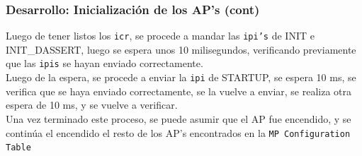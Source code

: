 \documentclass{beamer}
\begin{document}
\begin{frame}
  \frametitle{Desarrollo: \small Inicialización de los AP's (cont)}
  Luego de tener listos los \texttt{icr}, se procede a mandar las \texttt{ipi's} de INIT e INIT\_DASSERT, luego se espera unos 10 milisegundos, verificando previamente que las \texttt{ipis} se hayan enviado correctamente. \\
  \vspace{10pt}
  Luego de la espera, se procede a enviar la \texttt{ipi} de STARTUP, se espera 10 ms, se verifica que se haya enviado correctamente, se la vuelve a enviar, se realiza otra espera de 10 ms, y se vuelve a verificar.\\
  \vspace{10pt}
  Una vez terminado este proceso, se puede asumir que el AP fue encendido, y se continúa el encendido el resto de los AP's encontrados en la \texttt{MP Configuration Table}
\end{frame}

% 
\end{document}
